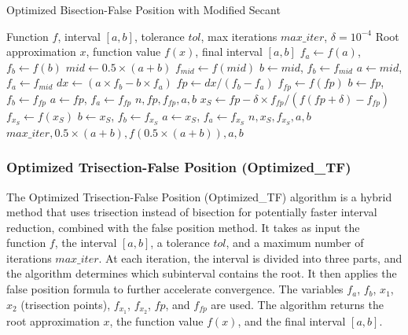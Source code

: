 \documentclass[11pt,a4paper]{article}
\begin{document}
\begin{algorithm}[H]
\caption{Optimized Bisection-False Position with Modified Secant}
\begin{algorithmic}[1]
\REQUIRE Function $f$, interval $[a,b]$, tolerance $tol$, max iterations $max\_iter$, $\delta = 10^{-4}$
\ENSURE Root approximation $x$, function value $f(x)$, final interval $[a,b]$
\STATE $f_a \leftarrow f(a)$, $f_b \leftarrow f(b)$
    \STATE $mid \leftarrow 0.5 \times (a + b)$
    \STATE $f_{mid} \leftarrow f(mid)$
        \STATE $b \leftarrow mid$, $f_b \leftarrow f_{mid}$
    \ELSE
        \STATE $a \leftarrow mid$, $f_a \leftarrow f_{mid}$
    \ENDIF
    \STATE $dx \leftarrow (a \times f_b - b \times f_a)$
    \STATE $fp \leftarrow dx / (f_b - f_a)$
    \STATE $f_{fp} \leftarrow f(fp)$
        \STATE $b \leftarrow fp$, $f_b \leftarrow f_{fp}$
    \ELSE
        \STATE $a \leftarrow fp$, $f_a \leftarrow f_{fp}$
    \ENDIF
        \RETURN $n, fp, f_{fp}, a, b$
    \ENDIF
    \STATE $x_S \leftarrow fp - \delta \times f_{fp} / (f(fp + \delta) - f_{fp})$
        \STATE $f_{x_S} \leftarrow f(x_S)$
                \STATE $b \leftarrow x_S$, $f_b \leftarrow f_{x_S}$
            \ELSE
                \STATE $a \leftarrow x_S$, $f_a \leftarrow f_{x_S}$
            \ENDIF
                \RETURN $n, x_S, f_{x_S}, a, b$
            \ENDIF
        \ENDIF
    \ENDIF
\ENDFOR
\RETURN $max\_iter, 0.5 \times (a + b), f(0.5 \times (a + b)), a, b$
\end{algorithmic}
\end{algorithm}

\subsubsection{Optimized Trisection-False Position (Optimized\_TF)}

The Optimized Trisection-False Position (Optimized\_TF) algorithm is a hybrid method that uses trisection instead of bisection for potentially faster interval reduction, combined with the false position method. It takes as input the function $f$, the interval $[a, b]$, a tolerance $tol$, and a maximum number of iterations $max\_iter$. At each iteration, the interval is divided into three parts, and the algorithm determines which subinterval contains the root. It then applies the false position formula to further accelerate convergence. The variables $f_a$, $f_b$, $x_1$, $x_2$ (trisection points), $f_{x_1}$, $f_{x_2}$, $fp$, and $f_{fp}$ are used. The algorithm returns the root approximation $x$, the function value $f(x)$, and the final interval $[a, b]$.
\end{document}
